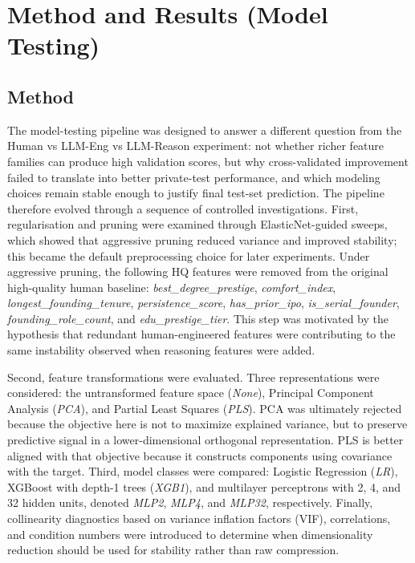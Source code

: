 \documentclass{article}
\theoremstyle{plain}
\theoremstyle{definition}
\theoremstyle{remark}
\begin{document}
\section{Method and Results (Model Testing)}
\subsection{Method}
The model-testing pipeline was designed to answer a different question from the Human vs LLM-Eng vs LLM-Reason experiment: not whether richer feature families can produce high validation scores, but why cross-validated improvement failed to translate into better private-test performance, and which modeling choices remain stable enough to justify final test-set prediction. The pipeline therefore evolved through a sequence of controlled investigations. First, regularisation and pruning were examined through ElasticNet-guided sweeps, which showed that aggressive pruning reduced variance and improved stability; this became the default preprocessing choice for later experiments. Under aggressive pruning, the following HQ features were removed from the original high-quality human baseline: \textit{best\_degree\_prestige}, \textit{comfort\_index}, \textit{longest\_founding\_tenure}, \textit{persistence\_score}, \textit{has\_prior\_ipo}, \textit{is\_serial\_founder}, \textit{founding\_role\_count}, and \textit{edu\_prestige\_tier}. This step was motivated by the hypothesis that redundant human-engineered features were contributing to the same instability observed when reasoning features were added.

Second, feature transformations were evaluated. Three representations were considered: the untransformed feature space (\textit{None}), Principal Component Analysis (\textit{PCA}), and Partial Least Squares (\textit{PLS}). PCA was ultimately rejected because the objective here is not to maximize explained variance, but to preserve predictive signal in a lower-dimensional orthogonal representation. PLS is better aligned with that objective because it constructs components using covariance with the target. Third, model classes were compared: Logistic Regression (\textit{LR}), XGBoost with depth-1 trees (\textit{XGB1}), and multilayer perceptrons with 2, 4, and 32 hidden units, denoted \textit{MLP2}, \textit{MLP4}, and \textit{MLP32}, respectively. Finally, collinearity diagnostics based on variance inflation factors (VIF), correlations, and condition numbers were introduced to determine when dimensionality reduction should be used for stability rather than raw compression.
\end{document}
